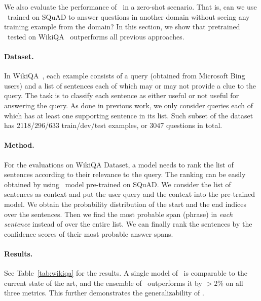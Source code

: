 We also evaluate the performance of \sysshort\ in a zero-shot scenario.
That is, can we use \sysshort\ trained on SQuAD to answer questions in another domain without seeing any training example from the domain?
In this section, we show that pretrained \sysshort\ tested on WikiQA~\citep{wikiqa} outperforms all previous approaches.


\paragraph{Dataset.}
In WikiQA~\citep{wikiqa}, each example consists of a query (obtained from Microsoft Bing users) and a list of sentences each of which may or may not provide a clue to the query.
The task is to classify each sentence as either useful or not useful for answering the query.
As done in previous work, we only consider queries each of which has at least one supporting sentence in its list.
Such subset of the dataset has 2118/296/633 train/dev/test examples, or 3047 questions in total.

\paragraph{Method.} For the evaluations on WikiQA Dataset, a model needs to rank the list of sentences according to their relevance to the query. 
The ranking can be easily obtained by using \sysshort\ model pre-trained on SQuAD.
We consider the list of sentences as context and put the user query and the context into the pre-trained model.
We obtain the probability distribution of the start and the end indices over the sentences.
Then we find the most probable span (phrase) in \emph{each sentence} instead of over the entire list.
We can finally rank the sentences by the confidence scores of their most probable answer spans.


\paragraph{Results.} 
See Table~\ref{tab:wikiqa} for the results. A single model of \sysshort\ is comparable to the current state of the art, and the
ensemble of \sysshort\ outperforms it by $>2\%$ on all three metrics.
This further demonstrates the generalizability of \sysshort.


